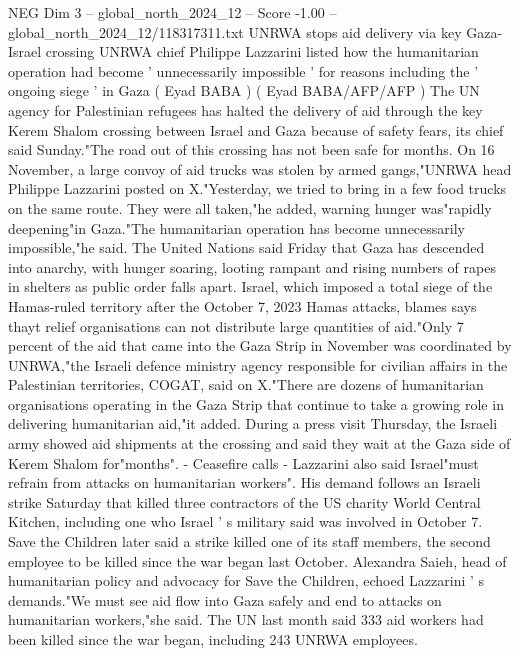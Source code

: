 \begin{textsample}{NEG Dim 3 – global\_north\_2024\_12 – Score -1.00 – global\_north\_2024\_12/118317311.txt}  \label{ex:f3_neg_230}
UNRWA stops aid delivery via key Gaza-Israel crossing UNRWA chief Philippe Lazzarini listed how the humanitarian operation had become ' unnecessarily impossible ' for reasons including the ' ongoing siege ' in Gaza ( Eyad BABA ) ( Eyad BABA/AFP/AFP ) The UN agency for Palestinian refugees has halted the delivery of aid through the key Kerem Shalom crossing between Israel and Gaza because of safety fears, its chief said Sunday."The road out of this crossing has not been safe for months.
On 16 November, a large convoy of aid trucks was stolen by armed gangs,"UNRWA head Philippe Lazzarini posted on X."Yesterday, we tried to bring in a few food trucks on the same route.
They were all taken,"he added, warning hunger was"rapidly deepening"in Gaza."The humanitarian operation has become unnecessarily impossible,"he said.
The United Nations said Friday that Gaza has descended into anarchy, with hunger soaring, looting rampant and rising numbers of rapes in shelters as public order falls apart.
Israel, which imposed a total siege of the Hamas-ruled territory after the October 7, 2023 Hamas attacks, blames says thayt relief organisations can not distribute large quantities of aid."Only 7 percent of the aid that came into the Gaza Strip in November was coordinated by UNRWA,"the Israeli defence ministry agency responsible for civilian affairs in the Palestinian territories, COGAT, said on X."There are dozens of humanitarian organisations operating in the Gaza Strip that continue to take a growing role in delivering humanitarian aid,"it added.
During a press visit Thursday, the Israeli army showed aid shipments at the crossing and said they wait at the Gaza side of Kerem Shalom for"months". - Ceasefire calls - Lazzarini also said Israel"must refrain from attacks on humanitarian workers".
His demand follows an Israeli strike Saturday that killed three contractors of the US charity World Central Kitchen, including one who Israel ' s military said was involved in October 7.
Save the Children later said a strike killed one of its staff members, the second employee to be killed since the war began last October.
Alexandra Saieh, head of humanitarian policy and advocacy for Save the Children, echoed Lazzarini ' s demands."We must see aid flow into Gaza safely and end to attacks on humanitarian workers,"she said.
The UN last month said 333 aid workers had been killed since the war began, including 243 UNRWA employees.

\end{textsample}
